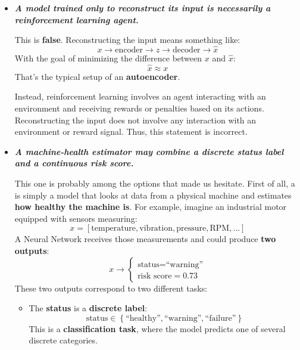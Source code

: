 \begin{itemize}
    \item[\textcolor{Red2}{\faIcon{times}}] \textcolor{Red2}{\textbf{\emph{A model trained only to reconstruct its input is necessarily a reinforcement learning agent.}}}

        This is \textbf{false}. Reconstructing the input means something like:
        \begin{equation*}
            x \to \text{encoder} \to z \to \text{decoder} \to \hat{x}
        \end{equation*}
        With the goal of minimizing the difference between $x$ and $\hat{x}$:
        \begin{equation*}
            \hat{x} \approx x
        \end{equation*}
        That's the typical setup of an \textbf{autoencoder}.

        Instead, reinforcement learning involves an agent interacting with an environment and receiving rewards or penalties based on its actions. Reconstructing the input does not involve any interaction with an environment or reward signal. Thus, this statement is incorrect.

    \item[\textcolor{Green3}{\faIcon{check}}] \textcolor{Green3}{\textbf{\emph{A machine-health estimator may combine a discrete status label and a continuous risk score.}}}

        This one is probably among the options that made us hesitate. First of all, a  is simply a model that looks at data from a physical machine and estimates \textbf{how healthy the machine is}. For example, imagine an industrial motor equipped with sensors measuring:
        \begin{equation*}
            x = \left[
                \text{temperature}, \text{vibration}, \text{pressure}, \text{RPM}, \ldots
            \right]
        \end{equation*}
        A Neural Network receives those measurements and could produce \textbf{two outputs}:
        \begin{equation*}
            x \to
            \begin{cases}
                \text{status} = \text{``warning''} \\
                \text{risk score} = 0.73
            \end{cases}
        \end{equation*}
        These two outputs correspond to two different tasks:
        \begin{itemize}
            \item The \textbf{status} is a \textbf{discrete label}:
                \begin{equation*}
                    \text{status} \in \left\{\text{``healthy''}, \text{``warning''}, \text{``failure''}\right\}
                \end{equation*}
                This is a \textbf{classification task}, where the model predicts one of several discrete categories.


\end{itemize}
\end{itemize}
